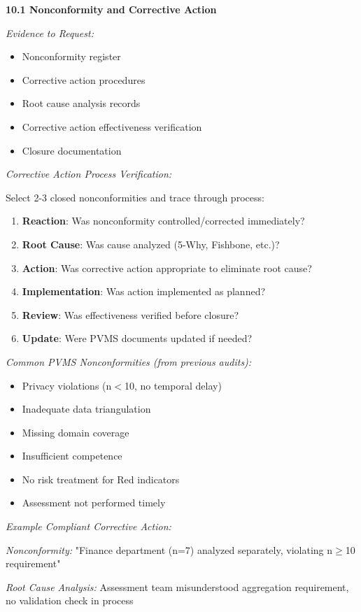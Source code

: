 \documentclass[11pt,a4paper]{article}
\begin{document}
\textbf{10.1 Nonconformity and Corrective Action}

\textit{Evidence to Request:}
\begin{itemize}
\item Nonconformity register
\item Corrective action procedures
\item Root cause analysis records
\item Corrective action effectiveness verification
\item Closure documentation
\end{itemize}

\textit{Corrective Action Process Verification:}

Select 2-3 closed nonconformities and trace through process:
\begin{enumerate}
\item \textbf{Reaction}: Was nonconformity controlled/corrected immediately?
\item \textbf{Root Cause}: Was cause analyzed (5-Why, Fishbone, etc.)?
\item \textbf{Action}: Was corrective action appropriate to eliminate root cause?
\item \textbf{Implementation}: Was action implemented as planned?
\item \textbf{Review}: Was effectiveness verified before closure?
\item \textbf{Update}: Were PVMS documents updated if needed?
\end{enumerate}

\textit{Common PVMS Nonconformities (from previous audits):}

\begin{itemize}
\item Privacy violations (n$<$10, no temporal delay)
\item Inadequate data triangulation
\item Missing domain coverage
\item Insufficient competence
\item No risk treatment for Red indicators
\item Assessment not performed timely
\end{itemize}

\textit{Example Compliant Corrective Action:}

\textit{Nonconformity:} "Finance department (n=7) analyzed separately, violating n$\geq$10 requirement"

\textit{Root Cause Analysis:} Assessment team misunderstood aggregation requirement, no validation check in process
\end{document}
